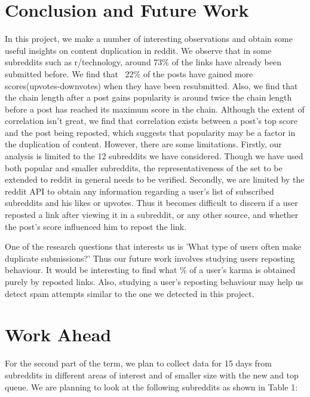 \documentclass{article} %
\begin{document}
\section{Conclusion and Future Work}
In this project, we make a number of interesting observations and obtain some useful insights on content duplication in reddit. We observe that in some subreddits such as r/technology, around 73\% of the links have already been submitted before. We find that ~22\% of the posts have gained more scores(upvotes-downvotes) when they have been resubmitted. Also, we find that the chain length after a post gains popularity is around twice the chain length before a post has reached its maximum score in the chain. Although the extent of correlation isn't great, we find that correlation exists between a post's top score and the post being reposted, which suggests that popularity may be a factor in the duplication of content. However, there are some limitations. Firstly, our analysis is limited to the 12 subreddits we have considered. Though we have used both popular and smaller subreddits, the representativeness of the set to be extended to reddit in general needs to be verified. Secondly, we are limited by the reddit API to obtain any information regarding a user's list of subscribed subreddits and his likes or upvotes. Thus it becomes difficult to discern if a user reposted a link after viewing it in a subreddit, or any other source, and whether the post's score influenced him to repost the link. 

One of the research questions that interests us is 'What type of users often make duplicate submissions?' Thus our future work involves studying users reposting behaviour. It would be interesting to find what \% of a user's karma is obtained purely by reposted links. Also, studying a user's reposting behaviour may help us detect spam attempts similar  to the one we detected in this project. 


\iffalse
\section{Work Ahead}
For the second part of the term, we plan to collect data for 15 days from subreddits in different areas of interest and of smaller size with the new and top queue. We are planning to look at the following subreddits as shown in Table 1:
\end{document}
